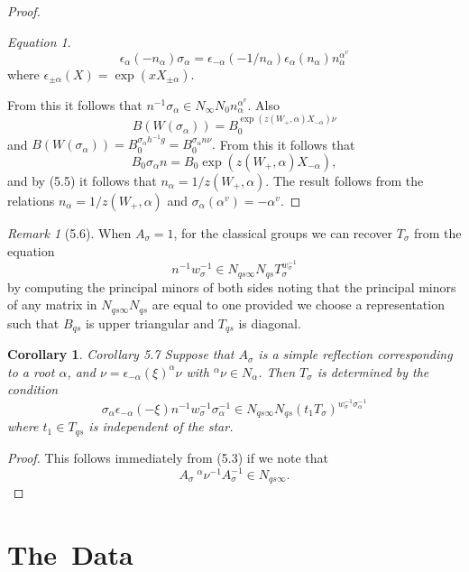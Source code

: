 \documentclass{memo-l}
\newtheorem{corollary}[theorem]{Corollary}
\theoremstyle{definition}
\theoremstyle{remark}
\newtheorem{remark}[theorem]{Remark}
\newtheorem{eqn}[theorem]{Equation}
\numberwithin{section}{chapter}
\numberwithin{equation}{chapter}
\begin{document}
\begin{proof}
\begin{eqn} %
$$\epsilon_\alpha(-n_{{\alpha}})
{\sigma}_{{\alpha}} = {\epsilon}_{-{\alpha}}(-1/n_{{\alpha}})
{\epsilon}_{{\alpha}}(n_{{\alpha}})n_{{\alpha}}^{\alpha^v}$$
where $\epsilon_{\pm\alpha}(X) = \exp(x X_{\pm\alpha})$.
\end{eqn}

\noindent
From this it follows that $n^{-1}{\sigma}_{{\alpha}} \in
N_{{\infty}}N_{0}n_{{\alpha}}^{\alpha^v}.$  Also
$$
B(W({\sigma}_{{\alpha}})) = B_{0}^{\exp(z(W_{+},{\alpha})X_{-{\alpha}})\nu}
$$
and $B(W({\sigma}_{{\alpha}})) = B_{0}^{\sigma_\alpha h^{-1}g}
= B_{0}^{\sigma_\alpha n{\nu}}.$  From this it follows that
$$
B_{0}{\sigma}_{{\alpha}}n = B_{0}\exp(z(W_{+},{\alpha})X_{-{\alpha}}) ,
$$
and by (5.5) it follows that $n_{{\alpha}} = 1/z(W_{+},{\alpha})$.
 The result follows from the relations $n_{{\alpha}} = 1/z(W_{+},{\alpha})$
and ${\sigma}_{{\alpha}}({\alpha}^{v}) = -{\alpha}^{v}$.
\end{proof}

\begin{remark}[5.6]    When $A_{{\sigma}} = 1$, for the classical
groups we can recover $T_{{\sigma}}$ from the equation $$n^{-1}w_{{\sigma}}^{-1}
\in N_{qs{\infty}}N_{qs}T_{{\sigma}}^{w_\sigma^{-1}}$$  by computing
the principal minors of both sides noting that the principal minors of any
matrix in $N_{qs{\infty}}N_{qs}$ are equal to one provided we choose a
representation such that $B_{qs}$ is upper triangular and $T_{qs}$ is diagonal.
\end{remark}

\begin{corollary}{Corollary 5.7}    Suppose that $A_{{\sigma}}$ is a simple reflection
corresponding to a root ${\alpha}$, and ${\nu} =
{\epsilon}_{-{\alpha}}({\xi})^{{\alpha}}{\nu}$ with $^{{\alpha}}{\nu} \in
N_{{\alpha}}$.
 Then $T_{{\sigma}}$ is determined by the condition
$$
\sigma_{{\alpha}}{\epsilon}_{-{\alpha}}(-{\xi})n^{-1}w_{{\sigma}}^{-1}
{\sigma}_{{\alpha}}^{-1} \in
N_{qs{\infty}}N_{qs}(t_{1}T_{{\sigma}})^{w_\sigma^{-1}{\sigma}_{{\alpha}}^{-1}}
$$
where $t_{1} \in T_{qs}$ is independent of the star.
\end{corollary}

\begin{proof}   This follows immediately from (5.3) if we note that
$$A_{{\sigma}}\ {}^{{\alpha}}{\nu}^{-1}A_{{\sigma}}^{-1} \in N_{qs{\infty}}.$$
\end{proof}


\section{{The\ Data}}
\end{document}
